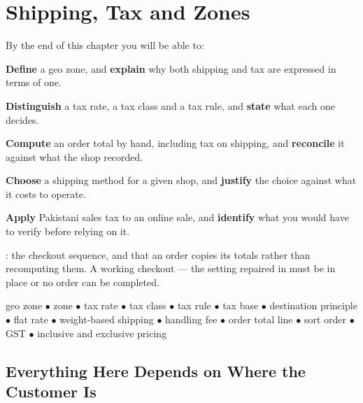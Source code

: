 \chapter{Shipping, Tax and Zones}\label{ch:shipping}

\begin{outcomes}
By the end of this chapter you will be able to:
\begin{tight}
  \item \textbf{Define} a geo zone, and \textbf{explain} why both shipping and
        tax are expressed in terms of one.
  \item \textbf{Distinguish} a tax rate, a tax class and a tax rule, and
        \textbf{state} what each one decides.
  \item \textbf{Compute} an order total by hand, including tax on shipping,
        and \textbf{reconcile} it against what the shop recorded.
  \item \textbf{Choose} a shipping method for a given shop, and
        \textbf{justify} the choice against what it costs to operate.
  \item \textbf{Apply} Pakistani sales tax to an online sale, and
        \textbf{identify} what you would have to verify before relying on it.
\end{tight}
\end{outcomes}

\begin{prereq}
: the checkout sequence, and that an order copies its totals
rather than recomputing them. A working checkout --- the setting repaired in
 must be in place or no order can be completed.
\end{prereq}

\begin{keyterms}
geo zone $\bullet$ zone $\bullet$ tax rate $\bullet$ tax class $\bullet$ tax
rule $\bullet$ tax base $\bullet$ destination principle $\bullet$ flat rate
$\bullet$ weight-based shipping $\bullet$ handling fee $\bullet$ order total
line $\bullet$ sort order $\bullet$ GST $\bullet$ inclusive and exclusive
pricing
\end{keyterms}

\section{Everything Here Depends on Where the Customer Is}

